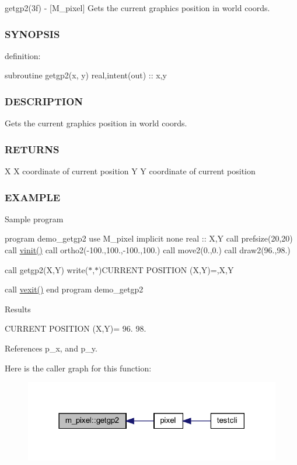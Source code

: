 getgp2(3f) -\/ \mbox{[}M\+\_\+pixel\mbox{]} Gets the current graphics position in world coords. 

\subsubsection*{S\+Y\+N\+O\+P\+S\+IS}

definition\+:

subroutine getgp2(x, y) real,intent(out) \+:\+: x,y

\subsubsection*{D\+E\+S\+C\+R\+I\+P\+T\+I\+ON}

Gets the current graphics position in world coords.

\subsubsection*{R\+E\+T\+U\+R\+NS}

X X coordinate of current position Y Y coordinate of current position

\subsubsection*{E\+X\+A\+M\+P\+LE}

Sample program

program demo\+\_\+getgp2 use M\+\_\+pixel implicit none real \+:\+: X,Y call prefsize(20,20) call \hyperlink{namespacem__pixel_ac03ca8f23fdadb60599b6ea4dc87a6d9}{vinit()} call ortho2(-\/100.,100.,-\/100.,100.) call move2(0.,0.) call draw2(96.,98.)

call getgp2(\+X,\+Y) write($\ast$,$\ast$)\textquotesingle{}C\+U\+R\+R\+E\+NT P\+O\+S\+I\+T\+I\+ON (X,Y)=\textquotesingle{},X,Y

call \hyperlink{namespacem__pixel_a19ad6b65752322b0029a62cc0ebec3e8}{vexit()} end program demo\+\_\+getgp2

Results

C\+U\+R\+R\+E\+NT P\+O\+S\+I\+T\+I\+ON (X,Y)= 96. 98. 

References p\+\_\+x, and p\+\_\+y.

Here is the caller graph for this function\+:
\nopagebreak
\begin{figure}[H]
\begin{center}
\leavevmode
\includegraphics[width=318pt]{namespacem__pixel_a626d769d3dae0c292e3ef1617ad43efb_icgraph}
\end{center}
\end{figure}
\mbox{\label{namespacem__pixel_a9f382cf8d3b69e11d1fdd2f2a4f59dea}} 
